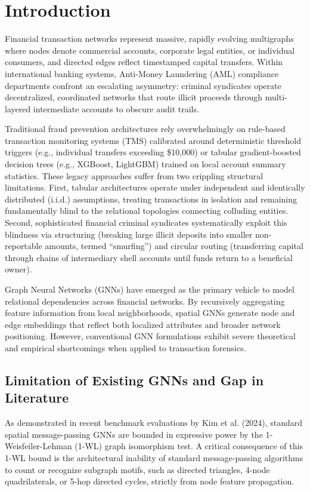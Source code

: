 \documentclass[10pt,twocolumn]{article}
\begin{document}
\section{Introduction}
Financial transaction networks represent massive, rapidly evolving multigraphs where nodes denote commercial accounts, corporate legal entities, or individual consumers, and directed edges reflect timestamped capital transfers. Within international banking systems, Anti-Money Laundering (AML) compliance departments confront an escalating asymmetry: criminal syndicates operate decentralized, coordinated networks that route illicit proceeds through multi-layered intermediate accounts to obscure audit trails. 

Traditional fraud prevention architectures rely overwhelmingly on rule-based transaction monitoring systems (TMS) calibrated around deterministic threshold triggers (e.g., individual transfers exceeding \$10,000) or tabular gradient-boosted decision trees (e.g., XGBoost, LightGBM) trained on local account summary statistics. These legacy approaches suffer from two crippling structural limitations. First, tabular architectures operate under independent and identically distributed (i.i.d.) assumptions, treating transactions in isolation and remaining fundamentally blind to the relational topologies connecting colluding entities. Second, sophisticated financial criminal syndicates systematically exploit this blindness via structuring (breaking large illicit deposits into smaller non-reportable amounts, termed ``smurfing'') and circular routing (transferring capital through chains of intermediary shell accounts until funds return to a beneficial owner).

Graph Neural Networks (GNNs) have emerged as the primary vehicle to model relational dependencies across financial networks. By recursively aggregating feature information from local neighborhoods, spatial GNNs generate node and edge embeddings that reflect both localized attributes and broader network positioning. However, conventional GNN formulations exhibit severe theoretical and empirical shortcomings when applied to transaction forensics.

\subsection{Limitation of Existing GNNs and Gap in Literature}
As demonstrated in recent benchmark evaluations by Kim et al. (2024), standard spatial message-passing GNNs are bounded in expressive power by the 1-Weisfeiler-Lehman (1-WL) graph isomorphism test. A critical consequence of this 1-WL bound is the architectural inability of standard message-passing algorithms to count or recognize subgraph motifs, such as directed triangles, 4-node quadrilaterals, or 5-hop directed cycles, strictly from node feature propagation. 
\end{document}
